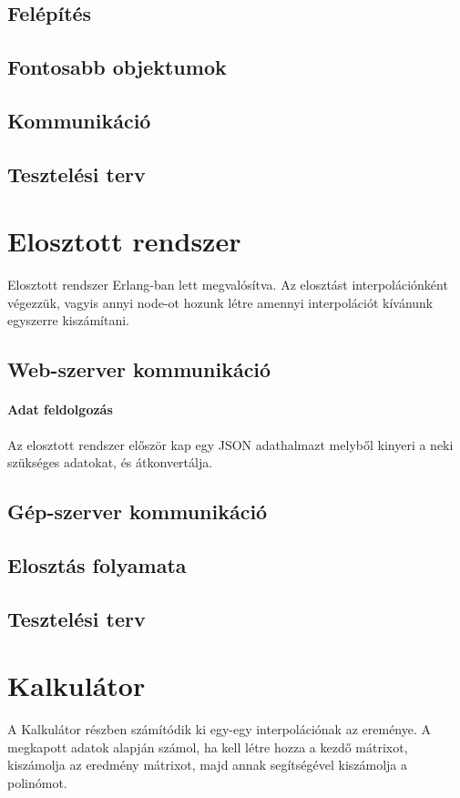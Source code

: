 \documentclass{elteikthesis}
\begin{document}
\subsection{Felépítés}
\subsection{Fontosabb objektumok}
\subsection{Kommunikáció}
\subsection{Tesztelési terv}

\section{Elosztott rendszer}
Elosztott rendszer Erlang-ban lett megvalósítva. Az elosztást interpolációnként végezzük, vagyis annyi node-ot hozunk létre amennyi interpolációt kívánunk egyszerre kiszámítani.
\subsection{Web-szerver kommunikáció}
\paragraph{Adat feldolgozás}
Az elosztott rendszer először kap egy JSON adathalmazt melyből kinyeri a neki szükséges adatokat, és átkonvertálja.
\subsection{Gép-szerver kommunikáció}
\subsection{Elosztás folyamata}
\subsection{Tesztelési terv}

\section{Kalkulátor}
A Kalkulátor részben számítódik ki egy-egy interpolációnak az ereménye.
A megkapott adatok alapján számol, ha kell létre hozza a kezdő mátrixot, kiszámolja az eredmény mátrixot, majd annak segítségével kiszámolja a polinómot.
\end{document}
